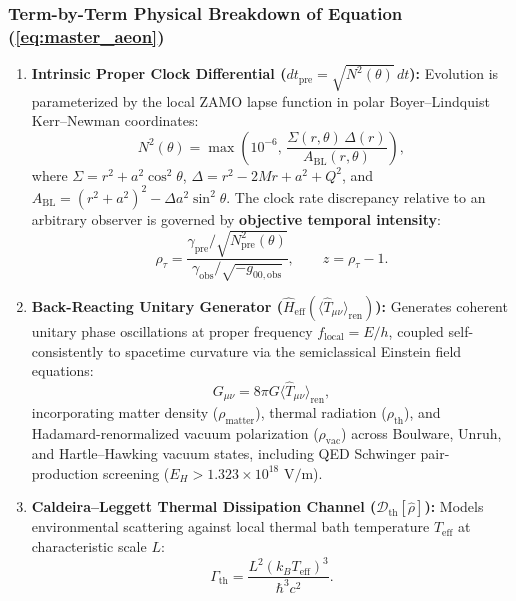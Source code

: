 \documentclass[11pt,a4paper]{article}
\begin{document}
\subsubsection*{Term-by-Term Physical Breakdown of Equation (\ref{eq:master_aeon})}
\begin{enumerate}[leftmargin=1.5em]
    \item \textbf{Intrinsic Proper Clock Differential ($dt_{\text{pre}} = \sqrt{N^2(\theta)}\,dt$):} Evolution is parameterized by the local ZAMO lapse function in polar Boyer--Lindquist Kerr--Newman coordinates:
    \begin{equation}
    N^2(\theta) = \max\!\left(10^{-6},\, \frac{\Sigma(r,\theta)\,\Delta(r)}{A_{\text{BL}}(r,\theta)}\right),
    \end{equation}
    where $\Sigma = r^2 + a^2\cos^2\theta$, $\Delta = r^2 - 2Mr + a^2 + Q^2$, and $A_{\text{BL}} = (r^2+a^2)^2 - \Delta a^2 \sin^2\theta$. The clock rate discrepancy relative to an arbitrary observer is governed by \textbf{objective temporal intensity}:
    \begin{equation}
    \rho_\tau = \frac{\gamma_{\text{pre}} / \sqrt{N^2_{\text{pre}}(\theta)}}{\gamma_{\text{obs}} / \sqrt{-g_{00,\text{obs}}}}, \qquad z = \rho_\tau - 1.
    \end{equation}
    \item \textbf{Back-Reacting Unitary Generator ($\hat{H}_{\text{eff}}(\langle \hat{T}_{\mu\nu}\rangle_{\text{ren}})$):} Generates coherent unitary phase oscillations at proper frequency $f_{\text{local}} = E/h$, coupled self-consistently to spacetime curvature via the semiclassical Einstein field equations:
    \begin{equation}
    G_{\mu\nu} = 8\pi G \langle \hat{T}_{\mu\nu}\rangle_{\text{ren}},
    \end{equation}
    incorporating matter density ($\rho_{\text{matter}}$), thermal radiation ($\rho_{\text{th}}$), and Hadamard-renormalized vacuum polarization ($\rho_{\text{vac}}$) across Boulware, Unruh, and Hartle--Hawking vacuum states, including QED Schwinger pair-production screening ($E_H > 1.323 \times 10^{18}\text{ V/m}$).
    \item \textbf{Caldeira--Leggett Thermal Dissipation Channel ($\mathcal{D}_{\text{th}}[\hat{\rho}]$):} Models environmental scattering against local thermal bath temperature $T_{\text{eff}}$ at characteristic scale $L$:
    \begin{equation}
    \Gamma_{\text{th}} = \frac{L^2 (k_B T_{\text{eff}})^3}{\hbar^3 c^2}.
    \end{equation}

\end{enumerate}
\end{document}
